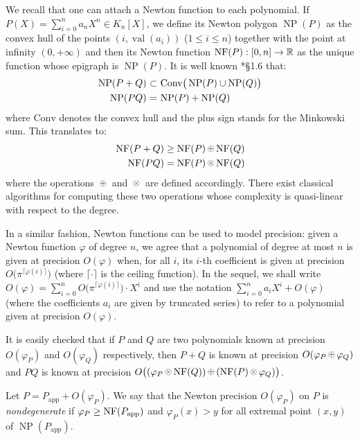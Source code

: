 \documentclass{sig-alternate-2013}
\DeclareMathOperator{\NP}{NP}
\DeclareMathOperator{\val}{val}
\newcommand{\R}{\mathbb R}
\newcommand{\NF}{\text{\rm NF}}
\newcommand{\nfop}[1]{%
\raisebox{-0.1mm}{\begin{tikzpicture}
\draw[transparent] (-0.18,0)--(0.18,0);
\draw[very thin] (0,0) circle (0.11cm);
\begin{scope}
\clip (0,0) circle (0.11cm);
\node[scale=0.75] at (0,0) { $#1$ };
\end{scope}
\end{tikzpicture}}}
\newcommand{\nfplus}{\nfop+}
\newcommand{\nftimes}{\nfop\times}
\newcommand{\app}{\textrm{app}}
\begin{document}
We recall that one can attach a Newton function to each polynomial.
If $P(X) = \sum_{i=0}^n a_n X^n \in K_n[X]$, we define its Newton
polygon $\NP(P)$ as the convex hull of the points $(i,\val(a_i))$ 
($1 \leq i \leq n$) together with the point at infinity $(0,+\infty)$
and then its Newton function $\NF(P) : [0,n] \to \R$ as the unique
function whose epigraph is $\NP(P)$. It is well known \cite{dwork-geratto-sullivan:Gfunctions}*{\S 1.6} that:
$$\begin{array}{r@{\,\,}c@{\,\,}l}
\NP(P+Q) & \subset & \text{Conv}\big(\NP(P) \cup \NP(Q)\big) \smallskip \\
\NP(PQ) & = & \NP(P) + \NP(Q)
\end{array}$$
where $\text{Conv}$ denotes the convex hull and the plus sign stands 
for the Minkowski sum. This translates to:
$$\begin{array}{r@{\,\,}c@{\,\,}l}
\NF(P+Q) \geq \NF(P) \nfplus \NF(Q) \smallskip \\
\NF(PQ) = \NF(P) \nftimes \NF(Q)
\end{array}$$
where the operations $\nfplus$ and $\nftimes$ are defined accordingly.
There exist classical algorithms for computing these two operations
whose complexity is quasi-linear with respect to the degree.

In a similar fashion, Newton functions can be used to model precision: 
given a Newton function $\varphi$ of degree $n$, we agree that a polynomial 
of degree at most $n$ is given at precision $O(\varphi)$ when, for all $i$,
its $i$-th coefficient is given at precision $O\big(\pi^{\lceil \varphi(i)
\rceil}\big)$ (where $\lceil \cdot \rceil$ is the ceiling function).
In the sequel, we shall write
$O(\varphi) = \sum_{i=0}^n O\big(\pi^{\lceil \varphi(i) \rceil}\big) \cdot X^i$
and use the notation $\sum_{i=0}^n a_i X^i + O(\varphi)$ (where the
coefficients $a_i$ are given by truncated series) to refer to a 
polynomial given at precision $O(\varphi)$.

It is easily checked that if $P$ and $Q$ are two polynomials known at 
precision $O(\varphi_P)$ and $O(\varphi_Q)$ respectively, then $P+Q$ is 
known at precision $O(\varphi_P \nfplus \varphi_Q)$ and $PQ$ is known at 
precision $O\big((\varphi_P \nftimes \NF(Q)) \nfplus (\NF(P) \nftimes 
\varphi_Q)\big)$.

\begin{deftn}
\label{def:nondeg}
Let $P = P_\app + O(\varphi_P)$. We say that the Newton precision 
$O(\varphi_P)$ on $P$ is \emph{nondegenerate} if $\varphi_P \geq 
\NF(P_\app)$ and $\varphi_P(x) > y$ for all extremal point $(x,y)$ of 
$\NP(P_\app)$.
\end{deftn}
\end{document}
